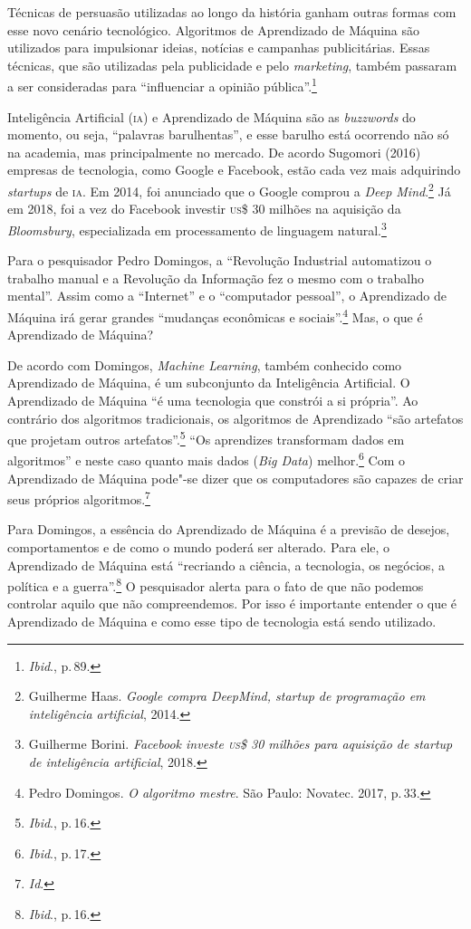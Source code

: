 Técnicas de persuasão utilizadas ao longo da história ganham outras
formas com esse novo cenário tecnológico. Algoritmos de Aprendizado de
Máquina são utilizados para impulsionar ideias, notícias e campanhas
publicitárias. Essas técnicas, que são utilizadas pela publicidade e
pelo \textit{marketing}, também passaram a ser consideradas para ``influenciar a
opinião pública''.\footnote{\textit{Ibid}., p.\,89.}

Inteligência Artificial (\textsc{ia}) e Aprendizado de Máquina são as
\textit{buzzwords} do momento, ou seja, ``palavras barulhentas'', e esse
barulho está ocorrendo não só na academia, mas principalmente no
mercado. De acordo Sugomori (2016) empresas de tecnologia, como Google e
Facebook, estão cada vez mais adquirindo \textit{startups} de \textsc{ia}. Em 2014,
foi anunciado que o Google comprou a \textit{Deep Mind}.\footnote{Guilherme Haas. \textit{Google compra DeepMind, startup de programação
em inteligência artificial}, 2014.} Já
em 2018, foi a vez do Facebook investir \textsc{us}\$ 30 milhões na aquisição da
\textit{Bloomsbury}, especializada em processamento de linguagem natural.\footnote{Guilherme Borini. \textit{Facebook investe \textsc{us}\$ 30 milhões para
aquisição de startup de inteligência artificial}, 2018.}

Para o pesquisador Pedro Domingos, a ``Revolução Industrial
automatizou o trabalho manual e a Revolução da Informação fez o mesmo
com o trabalho mental''. Assim como a ``Internet'' e o ``computador
pessoal'', o Aprendizado de Máquina irá gerar grandes ``mudanças
econômicas e sociais''.\footnote{Pedro Domingos. \textit{O algoritmo mestre}. São Paulo: Novatec. 2017, p.\,33.} Mas, o que é Aprendizado de Máquina?

De acordo com Domingos, \textit{Machine Learning}, também conhecido
como Aprendizado de Máquina, é um subconjunto da Inteligência Artificial. O Aprendizado de Máquina ``é uma tecnologia que constrói a
si própria''. Ao contrário dos algoritmos tradicionais, os algoritmos de
Aprendizado ``são artefatos que projetam outros artefatos''.\footnote{\textit{Ibid}., p.\,16.}
``Os aprendizes transformam dados em algoritmos'' e neste caso quanto
mais dados (\textit{Big Data}) melhor.\footnote{\textit{Ibid}., p.\,17.} Com o Aprendizado de
Máquina pode"-se dizer que os computadores são capazes de criar seus
próprios algoritmos.\footnote{\textit{Id}.}

Para Domingos, a essência do Aprendizado de Máquina é a previsão
de desejos, comportamentos e de como o mundo poderá ser alterado. Para
ele, o Aprendizado de Máquina está ``recriando a ciência, a tecnologia,
os negócios, a política e a guerra''.\footnote{\textit{Ibid}., p.\,16.} O pesquisador alerta para
o fato de que não podemos controlar aquilo que não compreendemos. Por
isso é importante entender o que é Aprendizado de Máquina e como esse
tipo de tecnologia está sendo utilizado.


